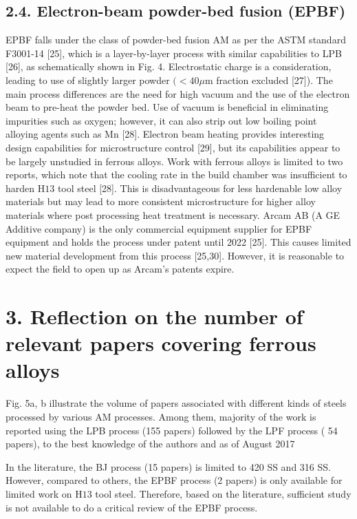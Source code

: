 \documentclass[10pt]{article}
\begin{document}
\subsection*{2.4. Electron-beam powder-bed fusion (EPBF)}
EPBF falls under the class of powder-bed fusion AM as per the ASTM standard F3001-14 [25], which is a layer-by-layer process with similar capabilities to LPB [26], as schematically shown in Fig. 4. Electrostatic charge is a consideration, leading to use of slightly larger powder $(<40 \mu \mathrm{m}$ fraction excluded [27]). The main process differences are the need for high vacuum and the use of the electron beam to pre-heat the powder bed. Use of vacuum is beneficial in eliminating impurities such as oxygen; however, it can also strip out low boiling point alloying agents such as Mn [28]. Electron beam heating provides interesting design capabilities for microstructure control [29], but its capabilities appear to be largely unstudied in ferrous alloys. Work with ferrous alloys is limited to two reports, which note that the cooling rate in the build chamber was insufficient to harden $\mathrm{H} 13$ tool steel [28]. This is disadvantageous for less hardenable low alloy materials but may lead to more consistent microstructure for higher alloy materials where post processing heat treatment is necessary. Arcam AB (A GE Additive company) is the only commercial equipment supplier for EPBF equipment and holds the process under patent until 2022 [25]. This causes limited new material development from this process [25,30]. However, it is reasonable to expect the field to open up as Arcam's patents expire.

\section*{3. Reflection on the number of relevant papers covering ferrous alloys}
Fig. 5a, b illustrate the volume of papers associated with different kinds of steels processed by various AM processes. Among them, majority of the work is reported using the LPB process (155 papers) followed by the LPF process ( 54 papers), to the best knowledge of the authors and as of August 2017

In the literature, the BJ process (15 papers) is limited to 420 SS and 316 SS. However, compared to others, the EPBF process (2 papers) is only available for limited work on $\mathrm{H} 13$ tool steel. Therefore, based on the literature, sufficient study is not available to do a critical review of the EPBF process.
\end{document}
